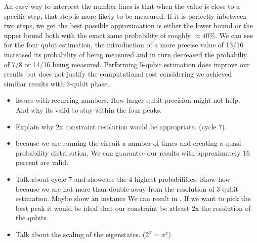 \documentclass[msc,oneside]{ubcthesis}
\begin{document}
	An easy way to interpret the number lines is that when the value is close to a specific step, that step is more likely to be measured. If it is perfectly inbetween two steps, we get the best possible approximation is either the lower bound or the upper bound both with the exact same probability of roughly $\approx 40\%$. We can see for the four qubit estimation, the introduction of a more precise value of 13/16 increased its probability of being measured and in turn decreased the probabiliy of 7/8 or 14/16 being measured. Performing 5-qubit estimation does improve our results but does not justify the computational cost considering we achieved similiar results with 3-qubit phase.
	
	

	\begin{itemize}
	\item Issues with recurring numbers. How larger qubit precision might not help. And why its valid to stay within the four peaks. 
	\item Explain why 2x constraint resolution would be appropriate. (cycle 7).
	
	\item because we are running the circuit a number of times and creating a quasi-probability distribution. We can guarantee our results with approximately 16 percent are valid.
	
	\item Talk about cycle 7 and showcase the 4 highest probabilities. Show how because we are not more than double away from the resolution of 3 qubit estimation.  Maybe show an instance We can result in . If we want to pick the best peak it would be ideal that our constraint be atleast 2x the resolution of the qubits.
	
	\item Talk about the scaling of the eigenstates.  ($2^x = x^x$)
	\end{itemize}
	
\end{document}
